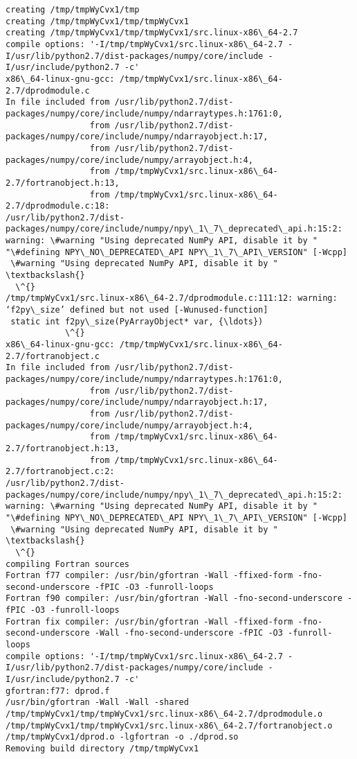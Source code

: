 \begin{Verbatim}[commandchars=\\\{\}]
creating /tmp/tmpWyCvx1/tmp
creating /tmp/tmpWyCvx1/tmp/tmpWyCvx1
creating /tmp/tmpWyCvx1/tmp/tmpWyCvx1/src.linux-x86\_64-2.7
compile options: '-I/tmp/tmpWyCvx1/src.linux-x86\_64-2.7 -I/usr/lib/python2.7/dist-packages/numpy/core/include -I/usr/include/python2.7 -c'
x86\_64-linux-gnu-gcc: /tmp/tmpWyCvx1/src.linux-x86\_64-2.7/dprodmodule.c
In file included from /usr/lib/python2.7/dist-packages/numpy/core/include/numpy/ndarraytypes.h:1761:0,
                 from /usr/lib/python2.7/dist-packages/numpy/core/include/numpy/ndarrayobject.h:17,
                 from /usr/lib/python2.7/dist-packages/numpy/core/include/numpy/arrayobject.h:4,
                 from /tmp/tmpWyCvx1/src.linux-x86\_64-2.7/fortranobject.h:13,
                 from /tmp/tmpWyCvx1/src.linux-x86\_64-2.7/dprodmodule.c:18:
/usr/lib/python2.7/dist-packages/numpy/core/include/numpy/npy\_1\_7\_deprecated\_api.h:15:2: warning: \#warning "Using deprecated NumPy API, disable it by " "\#defining NPY\_NO\_DEPRECATED\_API NPY\_1\_7\_API\_VERSION" [-Wcpp]
 \#warning "Using deprecated NumPy API, disable it by " \textbackslash{}
  \^{}
/tmp/tmpWyCvx1/src.linux-x86\_64-2.7/dprodmodule.c:111:12: warning: ‘f2py\_size’ defined but not used [-Wunused-function]
 static int f2py\_size(PyArrayObject* var, {\ldots})
            \^{}
x86\_64-linux-gnu-gcc: /tmp/tmpWyCvx1/src.linux-x86\_64-2.7/fortranobject.c
In file included from /usr/lib/python2.7/dist-packages/numpy/core/include/numpy/ndarraytypes.h:1761:0,
                 from /usr/lib/python2.7/dist-packages/numpy/core/include/numpy/ndarrayobject.h:17,
                 from /usr/lib/python2.7/dist-packages/numpy/core/include/numpy/arrayobject.h:4,
                 from /tmp/tmpWyCvx1/src.linux-x86\_64-2.7/fortranobject.h:13,
                 from /tmp/tmpWyCvx1/src.linux-x86\_64-2.7/fortranobject.c:2:
/usr/lib/python2.7/dist-packages/numpy/core/include/numpy/npy\_1\_7\_deprecated\_api.h:15:2: warning: \#warning "Using deprecated NumPy API, disable it by " "\#defining NPY\_NO\_DEPRECATED\_API NPY\_1\_7\_API\_VERSION" [-Wcpp]
 \#warning "Using deprecated NumPy API, disable it by " \textbackslash{}
  \^{}
compiling Fortran sources
Fortran f77 compiler: /usr/bin/gfortran -Wall -ffixed-form -fno-second-underscore -fPIC -O3 -funroll-loops
Fortran f90 compiler: /usr/bin/gfortran -Wall -fno-second-underscore -fPIC -O3 -funroll-loops
Fortran fix compiler: /usr/bin/gfortran -Wall -ffixed-form -fno-second-underscore -Wall -fno-second-underscore -fPIC -O3 -funroll-loops
compile options: '-I/tmp/tmpWyCvx1/src.linux-x86\_64-2.7 -I/usr/lib/python2.7/dist-packages/numpy/core/include -I/usr/include/python2.7 -c'
gfortran:f77: dprod.f
/usr/bin/gfortran -Wall -Wall -shared /tmp/tmpWyCvx1/tmp/tmpWyCvx1/src.linux-x86\_64-2.7/dprodmodule.o /tmp/tmpWyCvx1/tmp/tmpWyCvx1/src.linux-x86\_64-2.7/fortranobject.o /tmp/tmpWyCvx1/dprod.o -lgfortran -o ./dprod.so
Removing build directory /tmp/tmpWyCvx1

    \end{Verbatim}




